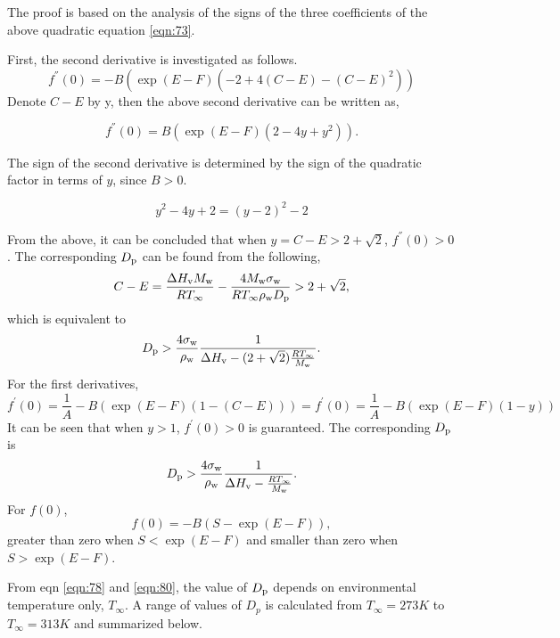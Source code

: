 \documentclass[12pt]{article}
\begin{document}
The proof is based on the analysis of the signs of the three coefficients of the above quadratic equation \ref{eqn:73}.

First, the second derivative is investigated as follows.
\begin{equation}
f^{''}(0)=-B(\exp(E-F)(-2+4(C-E)-(C-E)^2))
\end{equation}
Denote $C-E$ by y, then the above second derivative can be written as,

\begin{equation}
f^{''}(0)=B(\exp(E-F)(2-4y+y^2)).
\end{equation}

The sign of the second derivative is determined by the sign of the quadratic factor in terms of $y$, 
since $B>0$.

\begin{equation}
y^2-4y+2=(y-2)^2-2
\end{equation}

From the above, it can be concluded that when $y=C-E>2+\sqrt{2}$, $f^{''}(0)>0$.
The corresponding $D_{\rm p}$ can be found from the following,
\begin{equation}\label{eqn:77}
C-E=\frac{\Delta H_{\rm v}M_{\rm w}}{RT_{\infty}}-\frac{4M_{\rm w}\sigma_{\rm w}}{RT_{\infty}\rho_{\rm w}D_{\rm p}}>2+\sqrt{2},
\end{equation} 
which is equivalent to 
\begin{equation}\label{eqn:78}
D_{\rm p}>\frac{4 \sigma_{\rm w}}{\rho_{\rm w}}\frac{1}{\Delta H_{\rm v}-(2+\sqrt{2})\frac{R T_{\infty}}{M_{\rm w}}}.
\end{equation}
For the first derivatives, 
\begin{equation}\label{eqn:79}
f^{'}(0)=\frac{1}{A}-B(\exp(E-F)(1-(C-E)))=f^{'}(0)=\frac{1}{A}-B(\exp(E-F)(1-y))
\end{equation}
It can be seen that when $y>1$, $f^{'}(0)>0$ is guaranteed. The corresponding $D_{\rm p}$ is
\begin{equation}\label{eqn:80}
D_{\rm p}>\frac{4 \sigma_{\rm w}}{\rho_{\rm w}}\frac{1}{\Delta H_{\rm v}-\frac{R T_{\infty}}{M_{\rm w}}}.
\end{equation}
 For $f(0)$, 
\begin{equation}\label{eqn:81}
f(0)=-B(S-\exp(E-F)),
\end{equation} 
greater than zero when $S<\exp(E-F)$ and smaller than zero when $S>\exp(E-F)$.

From eqn \ref{eqn:78} and \ref{eqn:80}, the value of $D_{\rm p}$ depends on environmental temperature only, $T_{\infty}$. A range of values of $D_{p}$ is calculated from $T_{\infty}=273K$ to $T_{\infty}=313K$ and summarized below.
\end{document}

